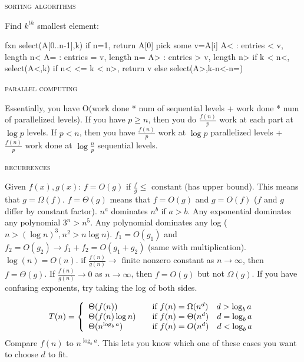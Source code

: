 \documentclass[10pt,twocolumn]{article}
\begin{document}
\begin{center}\textsc{sorting algorithms}\end{center} 
Find $k^{th}$ smallest element:
\begin{verbatimtab}[1]
fxn select(A[0..n-1],k)
	if n=1, return A[0]
	pick some v=A[i]
	A< : entries < v, length n<
	A= : entries = v, length n=
	A> : entries > v, length n>
	if k < n<, select(A<,k)
	if n< <= k < n>, return v
	else select(A>,k-n<-n=)
\end{verbatimtab}


\begin{center}\textsc{parallel computing}\end{center} 
Essentially, you have O(work done * num of sequential levels + work done * num of parallelized levels). If you have $p\geq n$, then you do $\frac{f(n)}{p} $ work at each part at $\log p$ levels. If $p < n$, then you have $\frac{f(n)}{p} $ work at $\log p$ parallelized levels + $\frac{f(n)}{p} $ work done at $\log \frac{n}{p} $ sequential levels.
\begin{center}\textsc{recurrences}\end{center} 
Given $f(x),g(x)$: $f = O(g)$ if $\frac{f}{g} \leq $ constant (has upper bound). This means that $g = \Omega(f)$. $f=\Theta(g)$ means that $f=O(g)$ and $g=O(f)$ ($f$ and $g$ differ by constant factor). $n^a$ dominates $n^b$ if $a>b$. Any exponential dominates any polynomial $3^n > n^5$. Any polynomial dominates any log ($n > (\log n)^3, n^2 > n\log n$). $f_1=O(g_1)$ and $f_2=O(g_2) \rightarrow f_1+f_2=O(g_1+g_2)$ (same with multiplication). $\log(n) = O(n)$. if $\frac{f(n)}{g(n)} \rightarrow$ finite nonzero constant as $n\rightarrow\infty$, then $f=\Theta(g)$. If $\frac{f(n)}{g(n)} \rightarrow 0$ as $n\rightarrow\infty$, then $f=O(g)$ but not $\Omega(g)$. If you have confusing exponents, try taking the log of both sides.

\[T(n) = \left\{ \begin{array}{l l} \Theta(f(n)) & \quad \mbox{if $f(n)=\Omega(n^d) \quad d>\log_b a$} \\ \Theta(f(n)\log n) & \quad \mbox{if $f(n) = \Theta(n^d) \quad d=\log_b a$} \\ \Theta(n^{\log_ba}) & \quad \mbox{if $f(n)=O(n^d) \quad d<\log_ba$}  \end{array} \right. \]
Compare $f(n)$ to $n^{\log_ba}$. This lets you know which one of these cases you want to choose $d$ to fit.
\end{document}
